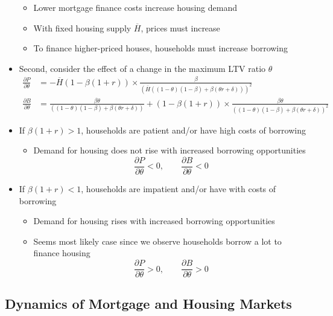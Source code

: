 \documentclass[a4paper]{article}
\begin{document}
\begin{itemize}
		\begin{itemize}
			\item Lower mortgage finance costs increase housing demand
			\item With fixed housing supply \( \overline{H} \), prices must increase
			\item To finance higher-priced houses, households must increase borrowing
		\end{itemize}
		\item Second, consider the effect of a \textcolor{myblue}{change in the maximum LTV ratio \( \theta \)}
		\begin{align*}
			\frac{\partial P}{\partial\theta} &= -\overline{H}(1-\beta(1+r)) \times \frac{\beta}{(\overline{H}((1-\theta)(1-\beta)+\beta(\theta r+\delta)))^2} \\
			\frac{\partial B}{\partial\theta} &= \frac{\beta\theta}{((1-\theta)(1-\beta)+\beta(\theta r+\delta))} + (1-\beta(1+r)) \times \frac{\beta\theta}{((1-\theta)(1-\beta)+\beta(\theta r+\delta))^2}
		\end{align*}
		\item If \( \beta(1+r) > 1 \), households are patient and/or have high costs of borrowing
		\begin{itemize}
			\item Demand for housing does not rise with increased borrowing opportunities
			\[
				\frac{\partial P}{\partial \theta} <0, \qquad \frac{\partial B}{\partial \theta} <0 
			\]
		\end{itemize}
		\item If \( \beta(1+r) < 1 \), households are impatient and/or have with costs of borrowing
		\begin{itemize}
			\item Demand for housing rises with increased borrowing opportunities
			\item Seems most likely case since we observe households borrow a lot to finance housing
			\[
				\frac{\partial P}{\partial \theta} >0, \qquad \frac{\partial B}{\partial \theta} >0 
			\]
		\end{itemize}
	\end{itemize}
\subsection{Dynamics of Mortgage and Housing Markets}
\end{document}
